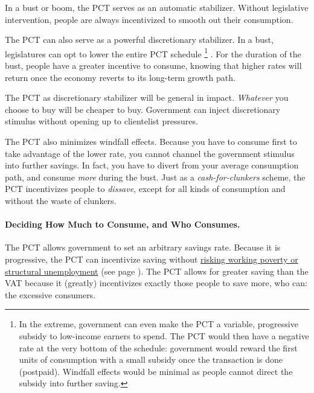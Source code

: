 
In a bust or boom, the PCT serves as an automatic stabilizer.
Without legislative intervention, people are always incentivized to smooth out their consumption.

The PCT can also serve as a powerful discretionary stabilizer.
In a bust, legislatures can opt to lower the entire PCT schedule
\footnote{
	In the extreme, government can even make the PCT a variable, progressive subsidy to low-income earners to spend.
	The PCT would then have a negative rate at the very bottom of the schedule:
	government would reward the first units of consumption with a small subsidy once the transaction is done (postpaid).
	Windfall effects would be minimal as people cannot direct the subsidy into further saving.
}
.
For the duration of the bust, people have a greater incentive to consume, knowing that higher rates will return once the economy reverts to its long-term growth path.

The PCT as discretionary stabilizer will be general in impact.
\emph{Whatever} you choose to buy will be cheaper to buy.
Government can inject discretionary stimulus without opening up to clientelist pressures.

The PCT also minimizes windfall effects.
Because you have to consume first to take advantage of the lower rate, you cannot channel the government stimulus into further savings.
In fact, you have to divert from your average consumption path, and consume \emph{more} during the bust.
Just as a \emph{cash-for-clunkers} scheme, the PCT incentivizes people to \emph{dissave}, except for all kinds of consumption and without the waste of clunkers.

\paragraph{Deciding How Much to Consume, and Who Consumes.}
The PCT allows government to set an arbitrary savings rate.
Because it is progressive, the PCT can incentivize saving without \hyperref[des:low-price-floor]{risking working poverty or structural unemployment} (see page \pageref{des:low-price-floor}).
The PCT allows for greater saving than the VAT because it (greatly) incentivizes exactly those people to save more, who can:
the excessive consumers.

